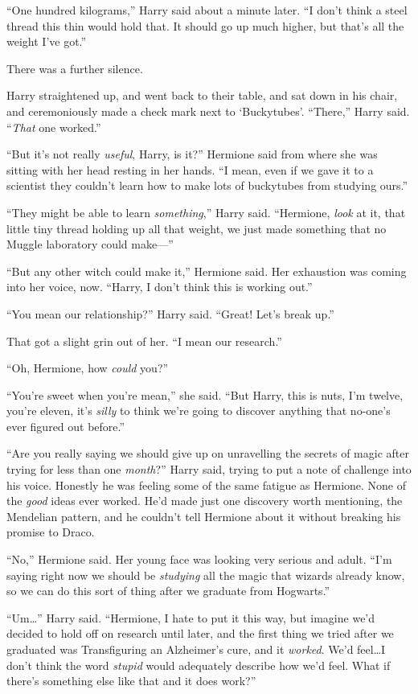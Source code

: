 “One hundred kilograms,” Harry said about a minute later. “I don’t think a steel thread this thin would hold that. It should go up much higher, but that’s all the weight I’ve got.”

There was a further silence.

Harry straightened up, and went back to their table, and sat down in his chair, and ceremoniously made a check mark next to ‘Buckytubes’. “There,” Harry said. “\emph{That} one worked.”

“But it’s not really \emph{useful}, Harry, is it?” Hermione said from where she was sitting with her head resting in her hands. “I mean, even if we gave it to a scientist they couldn’t learn how to make lots of buckytubes from studying ours.”

“They might be able to learn \emph{something},” Harry said. “Hermione, \emph{look} at it, that little tiny thread holding up all that weight, we just made something that no Muggle laboratory could make—”

“But any other witch could make it,” Hermione said. Her exhaustion was coming into her voice, now. “Harry, I don’t think this is working out.”

“You mean our relationship?” Harry said. “Great! Let’s break up.”

That got a slight grin out of her. “I mean our research.”

“Oh, Hermione, how \emph{could} you?”

“You’re sweet when you’re mean,” she said. “But Harry, this is nuts, I’m twelve, you’re eleven, it’s \emph{silly} to think we’re going to discover anything that no-one’s ever figured out before.”

“Are you really saying we should give up on unravelling the secrets of magic after trying for less than one \emph{month}?” Harry said, trying to put a note of challenge into his voice. Honestly he was feeling some of the same fatigue as Hermione. None of the \emph{good} ideas ever worked. He’d made just one discovery worth mentioning, the Mendelian pattern, and he couldn’t tell Hermione about it without breaking his promise to Draco.

“No,” Hermione said. Her young face was looking very serious and adult. “I’m saying right now we should be \emph{studying} all the magic that wizards already know, so we can do this sort of thing after we graduate from Hogwarts.”

“Um…” Harry said. “Hermione, I hate to put it this way, but imagine we’d decided to hold off on research until later, and the first thing we tried after we graduated was Transfiguring an Alzheimer’s cure, and it \emph{worked}. We’d feel…I don’t think the word \emph{stupid} would adequately describe how we’d feel. What if there’s something else like that and it does work?”

